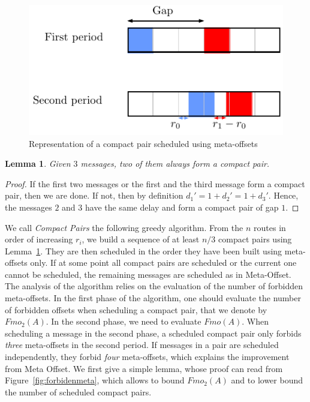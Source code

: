 \documentclass[10pt, conference, letterpaper]{IEEEtran}
\newtheorem{lemma}[theorem]{Lemma}
\begin{document}
\begin{figure}[h]
\begin{center}

\includegraphics[scale=0.7]{compact_pair}
\end{center}
\caption{Representation of a compact pair scheduled using meta-offsets}
\label{fig:compactpair}
\end{figure}

\begin{lemma}\label{lemma:pair_find}
Given $3$ messages, two of them always form a compact pair. 
\end{lemma}
\begin{proof}
If the first two messages or the first and the third message form a compact pair,
then we are done. If not, then by definition $d_{1}' = 1 + d_{2}' = 1 + d_{3}'$. Hence, the messages $2$ and $3$ have the same delay and form a compact pair of gap $1$.
\end{proof}

We call \emph{Compact Pairs} the following greedy algorithm. From the $n$ routes in order
of increasing $r_i$, we build a sequence of at least $n/3$ compact pairs using Lemma~\ref{lemma:pair_find}. They are then scheduled in the order they have been built using meta-offsets only. If at some point all compact pairs are scheduled or the current one cannot be scheduled, the remaining messages are scheduled as in Meta-Offset. The analysis of the algorithm relies on the evaluation of the number of forbidden meta-offsets. In the first phase of the algorithm, one should evaluate the number of forbidden offsets when scheduling a compact pair, that we denote by $Fmo_2(A)$. In the second phase, we need to evaluate $Fmo(A)$. When scheduling a message in the second phase, a scheduled compact pair only forbids \emph{three} meta-offsets in the second period. If messages in a pair are scheduled independently, they forbid \emph{four} meta-offsets, which explains the improvement from Meta Offset. We first give a simple lemma, whose proof can read from Figure~\ref{fig:forbidenmeta}, which allows to bound $Fmo_2(A)$ and to lower bound the number of scheduled compact pairs.
\end{document}
